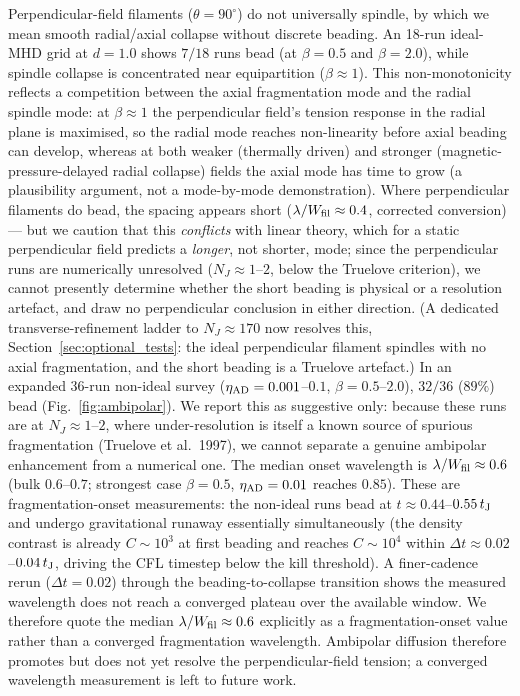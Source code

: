 \documentclass[usenatbib,twoside,twocolumn]{mnras}
\begin{document}
Perpendicular-field filaments ($\theta=90^\circ$) do not universally spindle, by which we mean smooth radial/axial collapse without discrete beading. An 18-run ideal-MHD grid at $d=1.0$ shows $7/18$ runs bead (at $\beta=0.5$ and $\beta=2.0$), while spindle collapse is concentrated near equipartition ($\beta\approx1$). This non-monotonicity reflects a competition between the axial fragmentation mode and the radial spindle mode: at $\beta\approx1$ the perpendicular field's tension response in the radial plane is maximised, so the radial mode reaches non-linearity before axial beading can develop, whereas at both weaker (thermally driven) and stronger (magnetic-pressure-delayed radial collapse) fields the axial mode has time to grow (a plausibility argument, not a mode-by-mode demonstration). Where perpendicular filaments do bead, the spacing appears short ($\lambda/W_{\rm fil}\approx0.4$, corrected conversion) --- but we caution that this \emph{conflicts} with linear theory, which for a static perpendicular field predicts a \emph{longer}, not shorter, mode; since the perpendicular runs are numerically unresolved ($N_J\approx1$--$2$, below the Truelove criterion), we cannot presently determine whether the short beading is physical or a resolution artefact, and draw no perpendicular conclusion in either direction. (A dedicated transverse-refinement ladder to $N_J\approx170$ now resolves this, Section~\ref{sec:optional_tests}: the ideal perpendicular filament spindles with no axial fragmentation, and the short beading is a Truelove artefact.) In an expanded 36-run non-ideal survey ($\eta_{\rm AD}=0.001$--$0.1$, $\beta=0.5$--$2.0$), $32/36$ ($89\%$) bead (Fig.~\ref{fig:ambipolar}). We report this as suggestive only: because these runs are at $N_J\approx1$--$2$, where under-resolution is itself a known source of spurious fragmentation (Truelove et al.\ 1997), we cannot separate a genuine ambipolar enhancement from a numerical one. The median onset wavelength is $\lambda/W_{\rm fil}\approx0.6$ (bulk $0.6$--$0.7$; strongest case $\beta=0.5$, $\eta_{\rm AD}=0.01$ reaches $0.85$). These are fragmentation-onset measurements: the non-ideal runs bead at $t\approx0.44$--$0.55\,t_{\rm J}$ and undergo gravitational runaway essentially simultaneously (the density contrast is already $C\sim10^3$ at first beading and reaches $C\sim10^4$ within $\Delta t\approx0.02$--$0.04\,t_{\rm J}$, driving the CFL timestep below the kill threshold). A finer-cadence rerun ($\Delta t=0.02$) through the beading-to-collapse transition shows the measured wavelength does not reach a converged plateau over the available window. We therefore quote the median $\lambda/W_{\rm fil}\approx0.6$ explicitly as a fragmentation-onset value rather than a converged fragmentation wavelength. Ambipolar diffusion therefore promotes but does not yet resolve the perpendicular-field tension; a converged wavelength measurement is left to future work.
\end{document}

